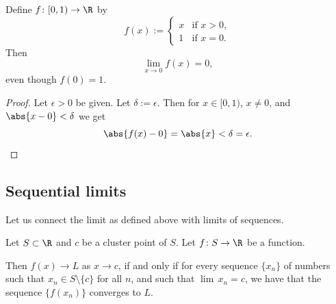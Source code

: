 \documentclass[12pt]{book}
\begin{document}
\begin{example}
Define $f \colon [0,1) \to \R$ by
\begin{equation*}
f(x) := 
\begin{cases}
x & \text{if $x > 0$} , \\
1 & \text{if $x = 0$} .
\end{cases}
\end{equation*}
Then
\begin{equation*}
\lim_{x\to 0} f(x) = 0 ,
\end{equation*}
even though $f(0) = 1$.

\begin{proof}  Let $\epsilon > 0$ be given.
Let $\delta := \epsilon$.
Then for $x \in [0,1)$, $x \not= 0$, and $\abs{x-0} < \delta$ we get
\begin{equation*}
\abs{f(x) - 0} = \abs{x} < \delta = \epsilon .
\end{equation*}
\end{proof}
\end{example}

\subsection*{Sequential limits} \label{subseq:sequentiallimits}

Let us connect the limit as defined above with limits of sequences.

\begin{lemma}\label{seqflimit:lemma}
Let $S \subset \R$ and $c$ be a cluster point of $S$.
Let $f \colon S \to
\R$ be a function.

Then
$f(x) \to L$ as $x \to c$, if and only if for every sequence $\{ x_n \}$
of numbers such that $x_n \in S \setminus \{c\}$ for all $n$,
and such that $\lim\, x_n = c$,
we have that the sequence $\{ f(x_n) \}$ converges to $L$.
\end{lemma}
\end{document}
